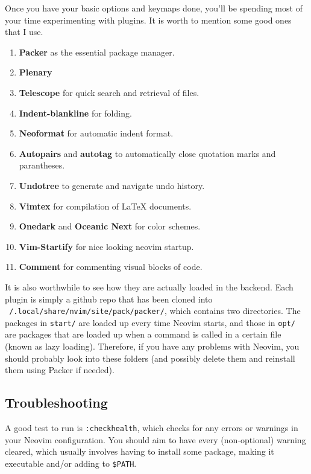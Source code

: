 \documentclass{article}
\theoremstyle{definition}
\begin{document}
    Once you have your basic options and keymaps done, you'll be spending most of your time experimenting with plugins. It is worth to mention some good ones that I use. 
    \begin{enumerate}
      \item \textbf{Packer} as the essential package manager.  
      \item \textbf{Plenary} 
      \item \textbf{Telescope} for quick search and retrieval of files.  
      \item \textbf{Indent-blankline} for folding. 
      \item \textbf{Neoformat} for automatic indent format. 
      \item \textbf{Autopairs} and \textbf{autotag} to automatically close quotation marks and parantheses. 
      \item \textbf{Undotree} to generate and navigate undo history. 
      \item \textbf{Vimtex} for compilation of LaTeX documents. 
      \item \textbf{Onedark} and \textbf{Oceanic Next} for color schemes. 
      \item \textbf{Vim-Startify} for nice looking neovim startup. 
      \item \textbf{Comment} for commenting visual blocks of code. 
    \end{enumerate}

    It is also worthwhile to see how they are actually loaded in the backend. Each plugin is simply a github repo that has been cloned into \texttt{~/.local/share/nvim/site/pack/packer/}, which contains two directories. The packages in \texttt{start/} are loaded up every time Neovim starts, and those in \texttt{opt/} are packages that are loaded up when a command is called in a certain file (known as lazy loading). Therefore, if you have any problems with Neovim, you should probably look into these folders (and possibly delete them and reinstall them using Packer if needed).

  \subsection{Troubleshooting}

    A good test to run is \texttt{:checkhealth}, which checks for any errors or warnings in your Neovim configuration. You should aim to have every (non-optional) warning cleared, which usually involves having to install some package, making it executable and/or adding to \texttt{\$PATH}. 
\end{document}
